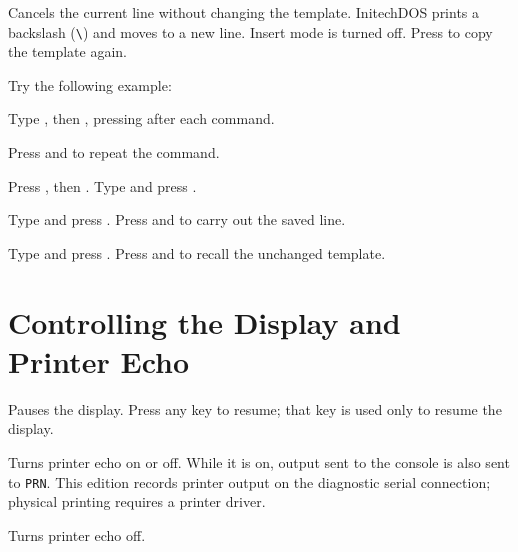 Cancels the current line without changing the template.
InitechDOS prints a backslash (\texttt{\textbackslash}) and moves to a new
line. Insert mode is turned off. Press  to copy the template again.

Try the following example:
\begin{Steps}
\item Type , then , pressing 
  after each command.
\item Press  and  to repeat the command.
\item Press , then . Type  and press .
\item Type  and press . Press  and
   to carry out the saved line.
\item Type  and press . Press  and
   to recall the unchanged template.
\end{Steps}


\section{Controlling the Display and Printer Echo}
Pauses the display. Press any key to resume; that key is
used only to resume the display.

Turns printer echo on or off. While it is on, output sent
to the console is also sent to \texttt{PRN}. This edition records printer
output on the diagnostic serial connection; physical printing requires a
printer driver.

Turns printer echo off.

